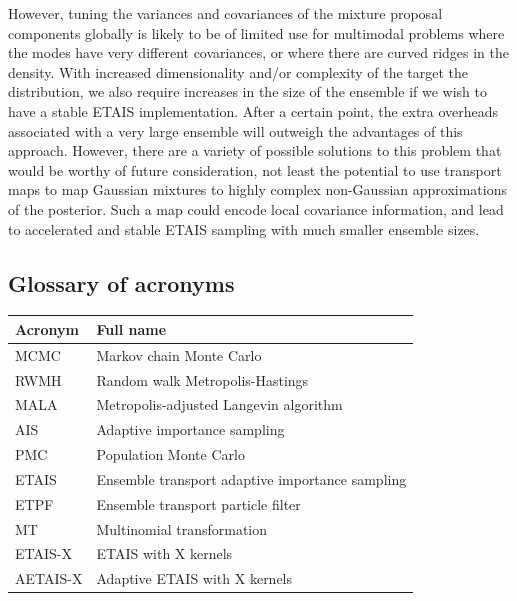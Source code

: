 \documentclass[final]{siamltex}
\newcommand{\revised}{}
\begin{document}
However, tuning the variances and
covariances of the mixture proposal components
globally is likely to be of limited use for multimodal problems where
the modes have very different covariances, or where there are curved
ridges in the density. {\revised With increased dimensionality and/or
  complexity of the target the distribution, we also require increases
  in the size of the ensemble if we wish to have a stable ETAIS
  implementation. After a certain point, the extra overheads
  associated with a very large ensemble will outweigh the advantages
  of this approach. However, there} are a variety of possible solutions to
this problem that would be worthy of future consideration, not least
the potential to use transport maps\cite{el2012bayesian,parno2014transport} to map Gaussian mixtures to
highly complex non-Gaussian approximations of the posterior. Such a
map could encode local covariance information, and lead to accelerated
and stable ETAIS sampling {\revised with much smaller ensemble sizes}.

\begin{appendix}

\section{Glossary of acronyms}

\begin{table}[h!]
\centering
\begin{tabular}{|l|l|}
\hline
Acronym & Full name                              \\ \hline
MCMC    & Markov chain Monte Carlo               \\
RWMH    & Random walk Metropolis-Hastings        \\
MALA    & Metropolis-adjusted Langevin algorithm \\
AIS     & Adaptive importance sampling           \\
PMC     & Population Monte Carlo                 \\
ETAIS    & Ensemble transport adaptive importance sampling  \\
ETPF    & Ensemble transport particle filter     \\
MT     & Multinomial transformation      \\
ETAIS-X  & ETAIS with X kernels                    \\
AETAIS-X & Adaptive ETAIS with X kernels          \\ \hline
\end{tabular}
\end{table}

\end{appendix}



\end{document}
